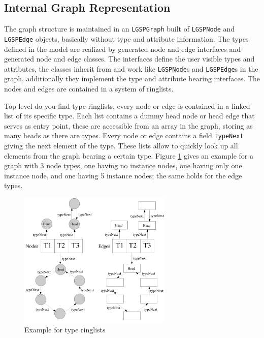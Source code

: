 \subsection*{Internal Graph Representation}
The graph structure is maintained in an \texttt{LGSPGraph} built of \texttt{LGSPNode} and \texttt{LGSPEdge} objects, basically without type and attribute information.
The types defined in the model are realized by generated node and edge interfaces and generated node and edge classes.
The interfaces define the user visible types and attributes, the classes inherit from and work like \texttt{LGSPNode}s and \texttt{LGSPEdge}s in the graph, additionally they implement the type and attribute bearing interfaces.
The nodes and edges are contained in a system of ringlists.

Top level do you find type ringlists, every node or edge is contained in a linked list of its specific type.
Each list contains a dummy head node or head edge that serves as entry point, 
these are accessible from an array in the graph, storing as many heads as there are types.
Every node or edge contains a field \texttt{typeNext} giving the next element of the type.
These lists allow to quickly look up all elements from the graph bearing a certain type.
Figure \ref{figtyperinglists} gives an example for a graph with 3 node types, one having no instance nodes, one having only one instance node, and one having 5 instance nodes; the same holds for the edge types.

\begin{figure}[htbp]
  \centering
  \includegraphics[width=0.65\textwidth]{fig/TypeRinglists}
  \caption{Example for type ringlists}
  \label{figtyperinglists}
\end{figure}

